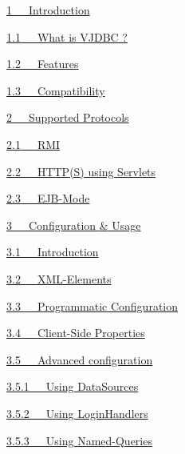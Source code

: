 \documentclass[10pt,a4paper,english]{article}
\begin{document}
\begin{list}{}{}
\item {} \href{\#introduction}{1~~~Introduction}
\begin{list}{}{}
\item {} \href{\#what-is-vjdbc}{1.1~~~What is VJDBC ?}

\item {} \href{\#features}{1.2~~~Features}

\item {} \href{\#compatibility}{1.3~~~Compatibility}

\end{list}

\item {} \href{\#supported-protocols}{2~~~Supported Protocols}
\begin{list}{}{}
\item {} \href{\#rmi}{2.1~~~RMI}

\item {} \href{\#http-s-using-servlets}{2.2~~~HTTP(S) using Servlets}

\item {} \href{\#ejb-mode}{2.3~~~EJB-Mode}

\end{list}

\item {} \href{\#configuration-usage}{3~~~Configuration {\&} Usage}
\begin{list}{}{}
\item {} \href{\#id1}{3.1~~~Introduction}

\item {} \href{\#xml-elements}{3.2~~~XML-Elements}

\item {} \href{\#programmatic-configuration}{3.3~~~Programmatic Configuration}

\item {} \href{\#client-side-properties}{3.4~~~Client-Side Properties}

\item {} \href{\#advanced-configuration}{3.5~~~Advanced configuration}
\begin{list}{}{}
\item {} \href{\#using-datasources}{3.5.1~~~Using DataSources}

\item {} \href{\#using-loginhandlers}{3.5.2~~~Using LoginHandlers}

\item {} \href{\#using-named-queries}{3.5.3~~~Using Named-Queries}


\end{list}
\end{list}
\end{list}
\end{document}

